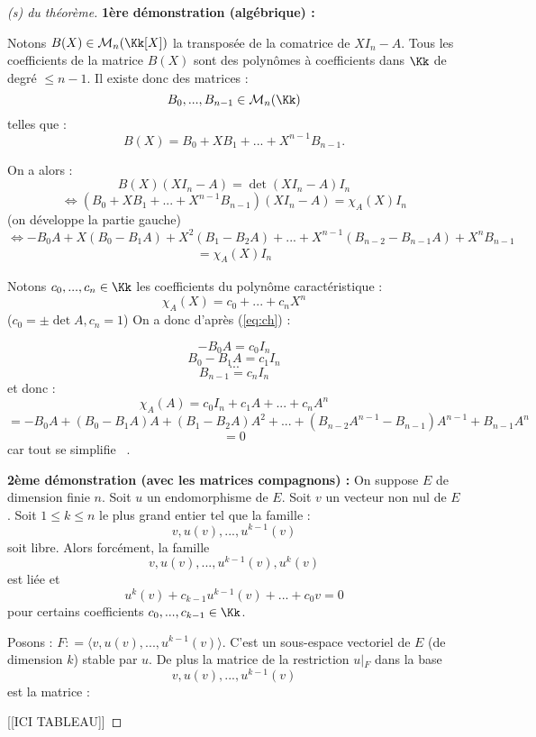 \documentclass[class=report,crop=false]{standalone}
\newcommand{\Res}[1]{{\left | {}_{#1} \right.}}
\begin{document}
\begin{proof}[(s) du théorème]

{\bf 1ère démonstration (algébrique) :}

Notons $B(X)\in \mathcal{M}_n(\Kk[X])$ la transposée de la comatrice de $XI_n -A$. Tous les coefficients de la matrice $B(X)$ sont des polynômes à coefficients dans $\Kk$ de degré $\le n-1$. Il existe donc des matrices :
\[B_0,...,B_{n-1} \in \mathcal{M}_n(\Kk)\]
telles que :
\[B(X) = B_0 + XB_1+...+X^{n-1}B_{n-1} .\]

On a alors :
\[B(X)(XI_n-A) = \det(XI_n-A)I_n\]
\[\iff (B_0 + XB_1+...+X^{n-1}B_{n-1})(XI_n-A) = \chi_A(X)I_n\]
(on développe la partie gauche)
\[
\iff -B_0A +X(B_0 -B_1A) + X^2(B_1-B_2A) + ... + X^{n-1}(B_{n-2}-B_{n-1}A) +X^nB_{n-1} \]
\begin{eqnarray}\label{eq:ch}= \chi_A(X)I_n
\end{eqnarray}

Notons $c_0,...,c_n \in \Kk$ les coefficients du polynôme caractéristique :
\[\chi_A(X) = c_0 + ...+c_nX^n\]
($c_0 = \pm \det A, c_n =1$)
On a donc d'après (\ref{eq:ch}) :

\[-B_0A = c_0I_n\]
\[B_0-B_1A = c_1I_n\]
\[...\]
\[B_{n-1} = c_n I_n\]
et donc :
\[\chi_A(A) = c_0 I_n + c_1A + ...+ c_n A^n \]
\[= -B_0A +(B_0-B_1A)A + (B_1-B_2A)A^2+...+(B_{n-2}A^{n-1}-B_{n-1})A^{n-1} + B_{n-1}A^n\]
\[=0\]
car \og tout se simplifie \fg\ .

{\bf 2ème démonstration (avec les matrices compagnons) :}
On suppose $E$ de dimension finie $n$.
Soit $u$ un endomorphisme de $E$. Soit $v$ un vecteur non nul de $E$. Soit $1 \le k \le n$ le plus grand entier tel que la famille :
\[v, u(v),...,u^{k-1}(v)\]
soit libre. Alors forcément, la famille 
\[v, u(v),...,u^{k-1}(v),u^{k}(v)\]
est liée et \[u^k(v) +c_{k-1}u^{k-1}(v) + ... +c_0v =0 \] pour certains coefficients $c_0,..., c_{k-1 }\in \Kk$.

Posons : $F: =\langle v, u(v),...,u^{k-1}(v) \rangle$. C'est un sous-espace vectoriel de $E$ (de dimension $k$) stable par $u$. De plus la matrice de la restriction $u\Res{F}$ dans la base 
\[v, u(v),...,u^{k-1}(v)\]
est la matrice :

[[ICI TABLEAU]]




\end{proof}
\end{document}
